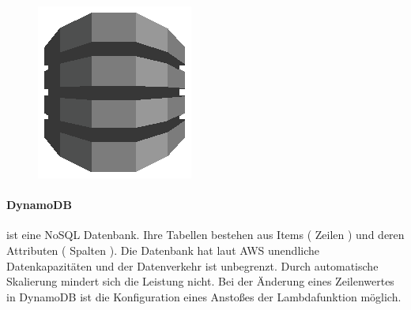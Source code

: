 \documentclass[
12pt,
english,
ngerman,
headsepline,
twoside,
openright,
numbers=noenddot,version=first
]{scrreprt}
\begin{document}
\begin{figure}
	\includegraphics[width=0.9\linewidth]{./pics/aws/Database_GRAYSCALE_AmazonDynamoDB.eps}
\end{figure}
\paragraph{DynamoDB} ist eine NoSQL Datenbank. Ihre Tabellen bestehen aus Items ( Zeilen ) und deren Attributen ( Spalten ). Die Datenbank hat laut \acrshort{AWS} unendliche Datenkapazitäten und der Datenverkehr ist unbegrenzt. 
Durch automatische Skalierung mindert sich die Leistung nicht. Bei der Änderung eines Zeilenwertes in DynamoDB ist die Konfiguration eines Anstoßes der Lambdafunktion möglich.
\end{document}

